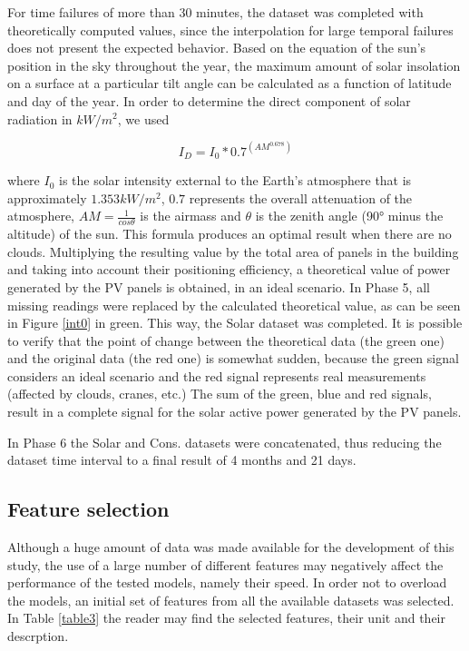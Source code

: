 For time failures of more than 30 minutes, the dataset was completed with theoretically computed values, since the interpolation for large temporal failures does not present the expected behavior.
Based on the equation of the sun's position in the sky throughout the year, the maximum amount of solar insolation on a surface at a particular tilt angle can be calculated as a function of latitude and day of the year\cite{solar0}. In order to determine the direct component of solar radiation in $kW/m^2$, we used


\begin{equation}
     I_D = I_0*0.7^{(AM^{0.678})}
\label{solar}
\end{equation}

where $I_0$ is the solar intensity external to the Earth's atmosphere that is approximately $1.353 kW/m^2$, $0.7$ represents the overall attenuation of the atmosphere, $AM = \frac{1}{cos\theta}$ is the airmass and $\theta$ is the zenith angle (90° minus the altitude) of the sun. This formula produces an optimal result when there are no clouds. Multiplying the resulting value by the total area of panels in the building and taking into account their positioning efficiency, a theoretical value of power generated by the \ac{PV} panels is obtained, in an ideal scenario. In Phase 5, all missing readings were replaced by the calculated theoretical value, as can be seen in Figure \ref{int0} in green. This way, the Solar dataset was completed. It is possible to verify that the point of change between the theoretical data (the green one) and the original data (the red one) is somewhat sudden, because the green signal considers an ideal scenario and the red signal represents real measurements (affected by clouds, cranes, etc.) The sum of the green, blue and red signals, result in a complete signal for the solar active power generated by the \ac{PV} panels.


In Phase 6 the Solar and Cons. datasets were concatenated, thus reducing the dataset time interval to a final result of 4 months and 21 days.



\subsection{Feature selection}

Although a huge amount of data was made available for the development of this study, the use of a large number of different features may negatively affect the performance of the tested models, namely their speed. In order not to overload the models, an initial set of features from all the available datasets was selected. In Table \ref{table3} the reader may find the selected features, their unit and their descrption.


